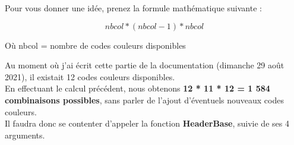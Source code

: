 \documentclass[a4paper,10pt]{article}
\begin{document}
Pour vous donner une idée, prenez la formule mathématique suivante :

\[nbcol * (nbcol - 1) * nbcol\]

Où nbcol = nombre de codes couleurs disponibles\linebreak

Au moment où j'ai écrit cette partie de la documentation (dimanche 29 août 2021), il existait 12 codes couleurs disponibles.\\[1\baselineskip]

En effectuant le calcul précédent, nous obtenons \textbf{12 * 11 * 12 = 1 584 combinaisons possibles}, sans\linebreak
parler de l'ajout d'éventuels nouveaux codes couleurs.\\[1\baselineskip]

Il faudra donc se contenter d'appeler la fonction \textbf{\color{mauve}HeaderBase\color{white}}, suivie de ses 4 arguments.
\end{document}
